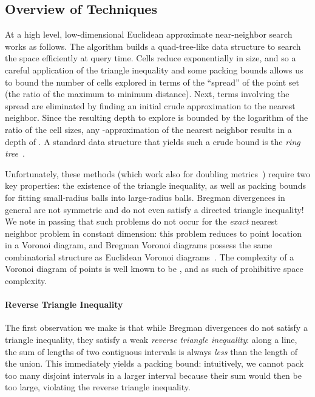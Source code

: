 \documentclass[11pt]{myclass}
\begin{document}
\subsection{Overview of Techniques}
\label{ssec:intro-key-ideas}

At a high level\cite{snotes}, low-dimensional Euclidean approximate near-neighbor search  works as follows. The algorithm builds a quad-tree-like data structure to search the space efficiently at query time. Cells reduce exponentially in size, and so a careful application of the triangle inequality and some packing bounds allows us to bound the number of cells explored in terms of the ``spread'' of the point set (the ratio of the maximum to minimum distance). Next, 
terms involving the spread are eliminated by finding an initial crude approximation to the nearest neighbor. 
Since the resulting depth to explore is bounded by the logarithm of the ratio of the cell sizes, any -approximation of the nearest neighbor results in a depth of . A standard data structure that yields such a crude bound is the \emph{ring tree}~\cite{blackbox}.

Unfortunately, these methods (which work also for doubling metrics~\cite{bounded,blackbox}) 
require two key properties: the existence of the triangle inequality, as well as packing bounds for fitting small-radius balls into large-radius balls. Bregman divergences in general are not symmetric and do not even satisfy a directed triangle inequality! We note in passing that such problems do not occur for the \emph{exact} nearest neighbor problem in constant dimension: this problem reduces to point location in a Voronoi diagram, and Bregman Voronoi diagrams possess the same combinatorial structure as Euclidean Voronoi diagrams~\cite{bvd}. The complexity of a Voronoi diagram of  points is well known to be , and as such of prohibitive space complexity.

\paragraph*{Reverse Triangle Inequality}
The first observation we make is that while Bregman divergences do not satisfy a triangle inequality, they satisfy a weak \emph{reverse triangle inequality}: 
along a line, the sum of lengths of two contiguous intervals is always \emph{less} than the length of the union. 
This immediately yields a packing bound: intuitively, we cannot pack too many disjoint intervals in a larger interval because their sum would then be too 
large, violating the reverse triangle inequality. 
\end{document}
